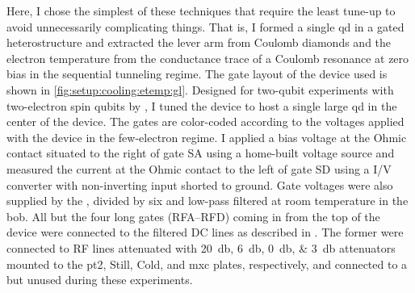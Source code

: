 Here, I chose the simplest of these techniques that require the least tune-up to avoid unnecessarily complicating things.
That is, I formed a single \gls{qd} in a gated \GaAsAlGaAs heterostructure and extracted the lever arm from Coulomb diamonds and the electron temperature from the conductance trace of a Coulomb resonance at zero bias in the sequential tunneling regime.
The gate layout of the device used is shown in \cref{fig:setup:cooling:etemp:gl}.
Designed for two-qubit experiments with two-electron spin qubits by \citet{Cerfontaine2019}, I tuned the device to host a single large \gls{qd} in the center of the device.
The gates are color-coded according to the voltages applied with the device in the few-electron regime.
I applied a bias voltage at the Ohmic contact situated to the right of gate SA
using a home-built \decadac voltage source and measured the current at the Ohmic contact to the left of gate SD using a \baseltia I/V converter with non-inverting input shorted to ground.
Gate voltages were also supplied by the \decadac, divided by six and low-pass filtered at room temperature in the \gls{bob}.
All but the four long gates (RFA--RFD) coming in from the top of the device were connected to the filtered DC lines as described in .
The former were connected to RF lines attenuated with \qtylist{20;6;0;3}{\decibel} attenuators mounted to the \gls{pt2}, Still, Cold, and \gls{mxc} plates, respectively, and connected to a \hdawg but unused during these experiments.

